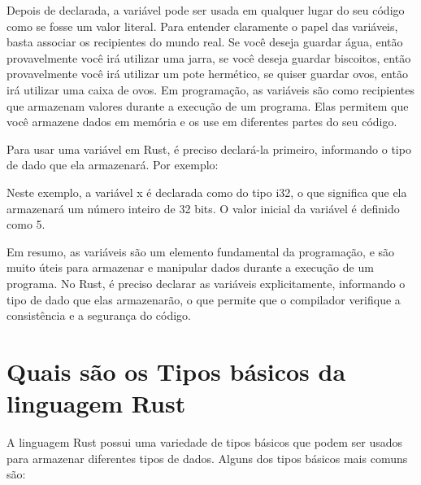 \documentclass[12pt,a4paper,oneside]{abntex2}
\begin{document}
Depois de declarada, a variável pode ser usada em qualquer lugar do seu código como se fosse um valor literal. Para entender claramente o papel das variáveis, basta associar os recipientes do mundo real. Se você deseja guardar água, então provavelmente você irá utilizar uma jarra, se você deseja guardar biscoitos, então provavelmente você irá utilizar um pote hermético, se quiser guardar ovos, então irá utilizar uma caixa de ovos. 
Em programação, as variáveis são como recipientes que armazenam valores durante a execução de um programa. Elas permitem que você armazene dados em memória e os use em diferentes partes do seu código.

Para usar uma variável em Rust, é preciso declará-la primeiro, informando o tipo de dado que ela armazenará. Por exemplo:



Neste exemplo, a variável x é declarada como do tipo i32, o que significa que ela armazenará um número inteiro de 32 bits. O valor inicial da variável é definido como 5.




Em resumo, as variáveis são um elemento fundamental da programação, e são muito úteis para armazenar e manipular dados durante a execução de um programa. No Rust, é preciso declarar as variáveis explicitamente, informando o tipo de dado que elas armazenarão, o que permite que o compilador verifique a consistência e a segurança do código.

\section{Quais são os Tipos básicos da linguagem Rust}

A linguagem Rust possui uma variedade de tipos básicos que podem ser usados para armazenar diferentes tipos de dados. Alguns dos tipos básicos mais comuns são:
\end{document}
